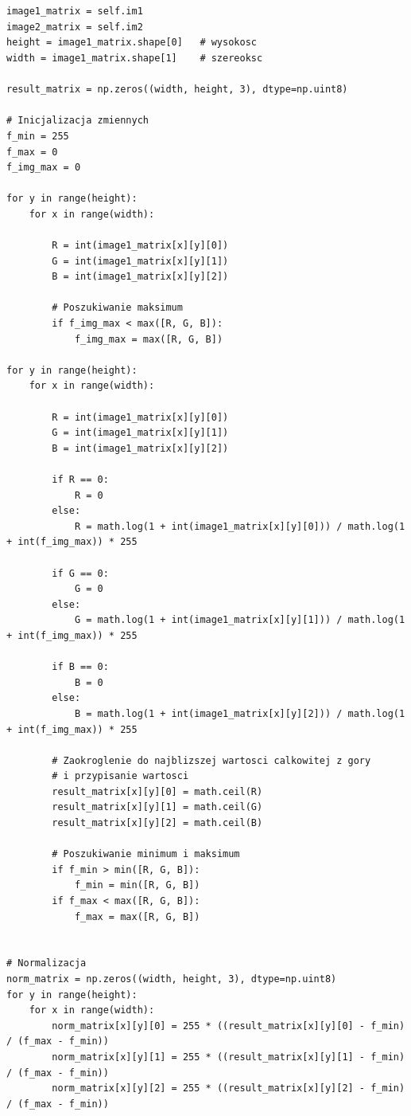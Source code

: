 \documentclass[final,a4paper,openany,12pt]{mwbk}
\begin{document}
\begin{lstlisting}[caption=Logarytmowanie obrazu barwowego]


image1_matrix = self.im1
image2_matrix = self.im2
height = image1_matrix.shape[0]   # wysokosc
width = image1_matrix.shape[1]    # szereoksc

result_matrix = np.zeros((width, height, 3), dtype=np.uint8)

# Inicjalizacja zmiennych
f_min = 255
f_max = 0
f_img_max = 0

for y in range(height):
    for x in range(width):  
        
        R = int(image1_matrix[x][y][0])
        G = int(image1_matrix[x][y][1])
        B = int(image1_matrix[x][y][2])

        # Poszukiwanie maksimum                
        if f_img_max < max([R, G, B]):
            f_img_max = max([R, G, B])

for y in range(height):
    for x in range(width):  
        
        R = int(image1_matrix[x][y][0])
        G = int(image1_matrix[x][y][1])
        B = int(image1_matrix[x][y][2])

        if R == 0:
            R = 0
        else:
            R = math.log(1 + int(image1_matrix[x][y][0])) / math.log(1 + int(f_img_max)) * 255

        if G == 0:
            G = 0
        else:
            G = math.log(1 + int(image1_matrix[x][y][1])) / math.log(1 + int(f_img_max)) * 255
        
        if B == 0:
            B = 0
        else:
            B = math.log(1 + int(image1_matrix[x][y][2])) / math.log(1 + int(f_img_max)) * 255

        # Zaokroglenie do najblizszej wartosci calkowitej z gory
        # i przypisanie wartosci
        result_matrix[x][y][0] = math.ceil(R)
        result_matrix[x][y][1] = math.ceil(G)
        result_matrix[x][y][2] = math.ceil(B)

        # Poszukiwanie minimum i maksimum                
        if f_min > min([R, G, B]):
            f_min = min([R, G, B])
        if f_max < max([R, G, B]):
            f_max = max([R, G, B])


# Normalizacja
norm_matrix = np.zeros((width, height, 3), dtype=np.uint8)
for y in range(height):
    for x in range(width):
        norm_matrix[x][y][0] = 255 * ((result_matrix[x][y][0] - f_min) / (f_max - f_min))
        norm_matrix[x][y][1] = 255 * ((result_matrix[x][y][1] - f_min) / (f_max - f_min))
        norm_matrix[x][y][2] = 255 * ((result_matrix[x][y][2] - f_min) / (f_max - f_min))

\end{lstlisting}
\newpage
\end{document}
